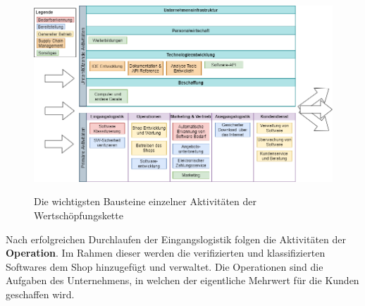 \begin{figure}[!h]
	\hspace{-1.5cm}
	\includegraphics[width=1.2\columnwidth]{pictures/konzept-wsk.png}
	\label{img:wsk}
	\caption{Die wichtigsten Bausteine einzelner Aktivitäten der Wertschöpfungskette}
\end{figure}
Nach erfolgreichen Durchlaufen der Eingangslogistik folgen die Aktivitäten der \textbf{Operation}. Im Rahmen dieser werden die verifizierten und klassifizierten Softwares dem Shop hinzugefügt und verwaltet. Die Operationen sind die Aufgaben des Unternehmens, in welchen der eigentliche Mehrwert für die Kunden geschaffen wird. 
